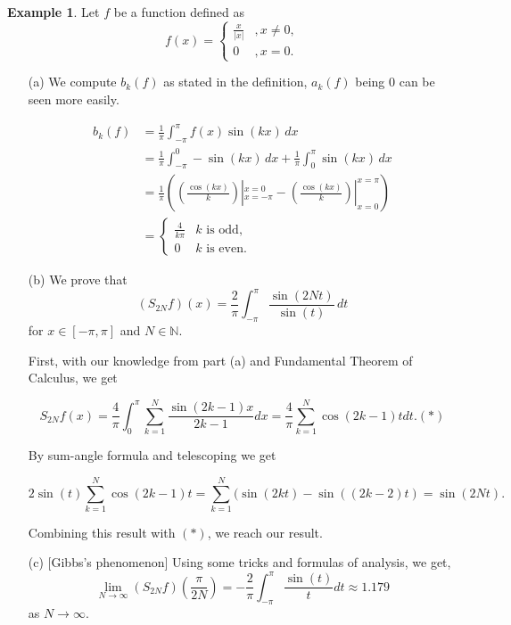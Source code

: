 \documentclass[12pt]{amsart}
\theoremstyle{definition}
\newtheorem{example}[theorem]{Example}
\begin{document}
     \begin{example}
     Let \(f\) be a function defined as
    \[
    f(x) = \begin{cases}
        \frac{x}{|x|} &, x \neq 0 \text{,}\\
        0             &, x = 0 \text{.}
    \end{cases}
    \]
    \begin{itemize}
    
    \item[(a)] We compute $b_k(f)$ as stated in the definition, $a_k(f)$ being 0 can be seen more easily.

\[
    \begin{aligned}
         b_k(f) &= \frac{1}{\pi}\int_{-\pi}^{\pi} f(x) \sin(kx)\,dx\\
                &= \frac{1}{\pi}\int_{-\pi}^{0} - \sin(kx)\,dx + \frac{1}{\pi}\int_{0}^{\pi} \sin(kx)\,dx\\
                &= \frac{1}{\pi} \left(\left(\frac{\cos(kx)}{k}\right)|_{x=-\pi}^{x=0} - \left(\frac{\cos(kx)}{k}\right)|_{x=0}^{x=\pi}\right)\\
                &= \begin{cases}
                    \frac{4}{k\pi} & \text{$k$ is odd,} \\
                                 0 & \text{$k$ is even.}
                \end{cases}
    \end{aligned}
\]


    \item[(b)]  We prove that
    \[
    (S_{2N} f)(x) = \frac{2}{\pi} \int_{-\pi}^{\pi} \frac{\sin(2Nt)}{\sin(t)} \,dt
    \]
    for $x \in [-\pi,\pi]$ and $N \in \mathbb{N}$.

    First, with our knowledge from part (a) and Fundamental Theorem of Calculus, we get


    \[
    S_{2N}f(x) = \frac{4}{\pi}  \int_{0}^{\pi} \sum_{k = 1}^{N} \frac{\sin(2k - 1)x}{2k - 1}dx = \frac{4}{\pi} \sum_{k = 1}^{N} \cos(2k - 1)t dt. (\ast)
    \]


    By sum-angle formula and telescoping we get


    \[
   2 \sin(t) \sum_{k = 1}^{N} \cos(2k - 1)t =  \sum_{k = 1}^{N}(\sin(2kt) - \sin((2k-2)t) = \sin(2Nt).
    \]


    Combining this result with $(\ast)$, we reach our result.


    
    \item[(c)][Gibbs's phenomenon]  Using some tricks and formulas of analysis, we get,
    \[
    \lim_{N \to \infty}(S_{2N} f)(\frac{\pi}{2N}) = -\frac{2}{\pi}\int_{-\pi}^{\pi} \frac{\sin(t)}{t} dt \approx 1.179
    \]
    as $N \to \infty$.


\end{itemize}
\end{example}
\end{document}
